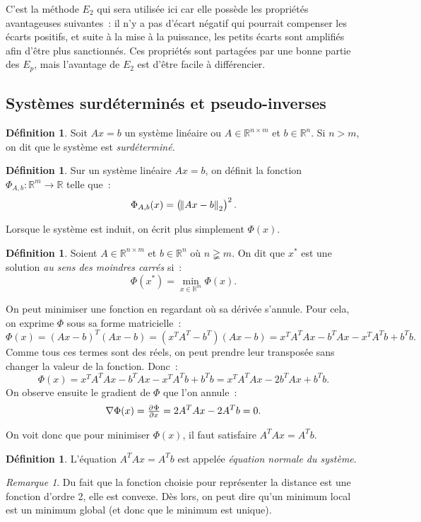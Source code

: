 \documentclass{article}
\theoremstyle{definition}
\newtheorem{déf}[thm]{Définition}
\theoremstyle{remark}
\newtheorem*{rmq}{Remarque}
\newcommand{\R}{\mathbb R}
\begin{document}
		C'est la méthode $E_2$ qui sera utilisée ici car elle possède les propriétés avantageuses suivantes~: il n'y a pas d'écart négatif qui pourrait compenser
		les écarts positifs, et suite à la mise à la puissance, les petits écarts sont amplifiés afin d'être plus sanctionnés. Ces propriétés sont partagées
		par une bonne partie des $E_p$, mais l'avantage de $E_2$ est d'être facile à différencier.

	\subsection{Systèmes surdéterminés et pseudo-inverses}
		\begin{déf} Soit $Ax = b$ un système linéaire ou $A \in \R^{n \times m}$ et $b \in \R^n$. Si $n > m$, on dit que le système est \emph{surdéterminé}.
		\end{déf}

		\begin{déf} Sur un système linéaire $Ax = b$, on définit la fonction $\Phi_{A,b} : \R^m \to \R$ telle que~:
		\[\Phi_{A,b}(x) = \left(\norm {Ax-b}_2\right)^2.\]

		Lorsque le système est induit, on écrit plus simplement $\Phi(x)$.
		\end{déf}

		\begin{déf} Soient $A \in \R^{n \times m}$ et $b \in \R^n$ où $n \gneqq m$. On dit que $x^*$ est une solution \emph{au sens des moindres carrés} si~:
		\[\Phi(x^*) = \min_{x \in \R^m}\Phi(x).\]
		\end{déf}

		On peut minimiser une fonction en regardant où sa dérivée s'annule. Pour cela, on exprime $\Phi$ sous sa forme matricielle~:
		\[\Phi(x) = (Ax-b)^T(Ax-b) = (x^TA^T - b^T)(Ax - b) = x^TA^TAx - b^TAx - x^TA^Tb + b^Tb.\]
		Comme tous ces termes sont des réels, on peut prendre leur transposée sans changer la valeur de la fonction. Donc~:
		\[\Phi(x) = x^TA^TAx - b^TAx - x^TA^Tb + b^Tb = x^TA^TAx - 2b^TAx + b^Tb.\]
		On observe ensuite le gradient de $\Phi$ que l'on annule~:
		\[\nabla \Phi(x) = \pd \Phi x = 2A^TAx - 2A^Tb = 0.\]

		On voit donc que pour minimiser $\Phi(x)$, il faut satisfaire $A^TAx = A^Tb$.

		\begin{déf} L'équation $A^TAx = A^Tb$ est appelée \emph{équation normale du système}. \end{déf}

		\begin{rmq} Du fait que la fonction choisie pour représenter la distance est une fonction d'ordre 2, elle est convexe. Dès lors, on peut dire qu'un
		minimum local est un minimum global (et donc que le minimum est unique).
		\end{rmq}
\end{document}
